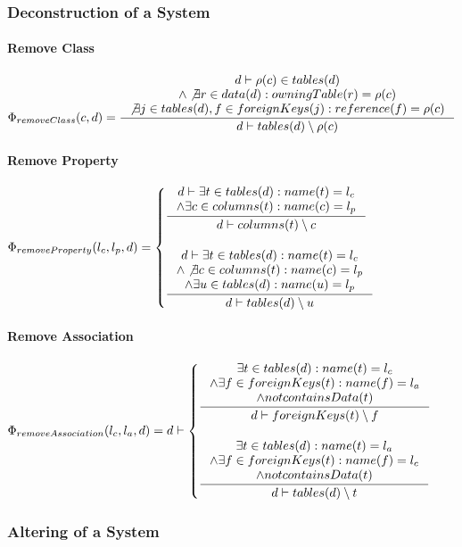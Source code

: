 \documentclass[11pt]{article}
\begin{document}
\subsubsection{Deconstruction of a System}
\paragraph{Remove Class}
$
\Phi_{removeClass}(c,d) = \inference{d \vdash \rho(c) \in tables(d) \\ \wedge \not \exists r \in data(d) : owningTable(r) = \rho(c) \\ \not \exists j \in tables(d), f \in foreignKeys(j) : reference(f) = \rho(c)  }{d \vdash tables(d) \setminus \rho(c)}
$

\paragraph{Remove Property}
$
\Phi_{removeProperty}(l_c, l_p, d) = \begin{cases}
 \inference{d \vdash \exists t \in tables(d) : name(t) = l_c \\ \wedge \exists c \in columns(t) : name(c) = l_p  }{d \vdash
columns(t) \setminus c
} \\ \\
  \inference{d \vdash \exists t \in tables(d) : name(t) = l_c \\ \wedge \not \exists c \in columns(t) : name(c) = l_p \\ \wedge \exists u \in tables(d) : name(u) = l_p }{d \vdash tables(d) \setminus u }
 \end{cases}
$

\paragraph{Remove Association}
$
\Phi_{removeAssociation}(l_c, l_a, d) = d \vdash \begin{cases}
 \inference{\exists t \in tables(d) : name(t) = l_c 
 \\ \wedge \exists f \in foreignKeys(t) : name(f) = l_a 
 \\ \wedge not containsData(t)}{d \vdash foreignKeys(t) \setminus f }
 \\ \\
 \inference{\exists t \in tables(d) : name(t) = l_a 
 \\ \wedge \exists f \in foreignKeys(t) : name(f) = l_c
 \\ \wedge not containsData(t)}{d \vdash tables(d) \setminus t}
 \end{cases}
$

\subsubsection{Altering of a System}	
\end{document}
